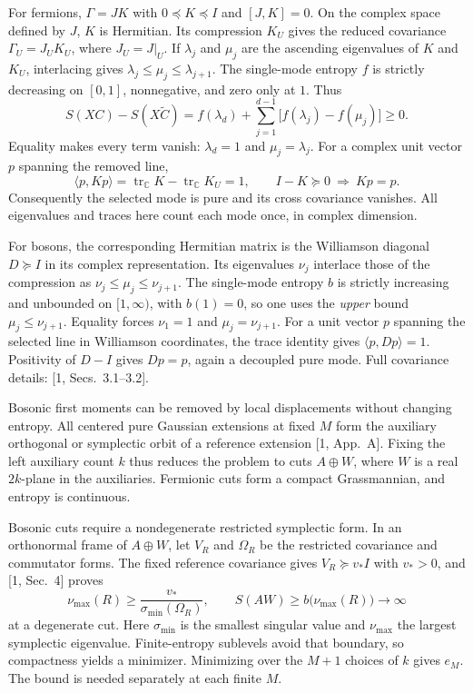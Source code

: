 \documentclass[11pt,a4paper]{article}
\newcommand{\C}{\mathbb C}
\newcommand{\tr}{\operatorname{tr}}
\newcommand{\heading}[1]{\par\vspace{5pt}{\large\bfseries #1}\par\vspace{1pt}}
\begin{document}
For fermions, $\Gamma=JK$ with $0\preceq K\preceq I$ and $[J,K]=0$. On the complex space defined by $J$, $K$ is Hermitian. Its compression $K_U$ gives the reduced covariance $\Gamma_U=J_UK_U$, where $J_U=J|_U$. If $\lambda_j$ and $\mu_j$ are the ascending eigenvalues of $K$ and $K_U$, interlacing gives $\lambda_j\le\mu_j\le\lambda_{j+1}$. The single-mode entropy $f$ is strictly decreasing on $[0,1]$, nonnegative, and zero only at $1$. Thus
\begin{equation*}
S(XC)-S(X\widetilde C)
=f(\lambda_d)+\sum_{j=1}^{d-1}\bigl[f(\lambda_j)-f(\mu_j)\bigr]\ge0.
\end{equation*}
Equality makes every term vanish: $\lambda_d=1$ and $\mu_j=\lambda_j$. For a complex unit vector $p$ spanning the removed line,
\begin{equation*}
\langle p,Kp\rangle=\tr_{\C}K-\tr_{\C}K_U=1,
\qquad I-K\succeq0\ \Longrightarrow\ Kp=p.
\end{equation*}
Consequently the selected mode is pure and its cross covariance vanishes. All eigenvalues and traces here count each mode once, in complex dimension.

For bosons, the corresponding Hermitian matrix is the Williamson diagonal $D\succeq I$ in its complex representation. Its eigenvalues $\nu_j$ interlace those of the compression as $\nu_j\le\mu_j\le\nu_{j+1}$. The single-mode entropy $b$ is strictly increasing and unbounded on $[1,\infty)$, with $b(1)=0$, so one uses the \emph{upper} bound $\mu_j\le\nu_{j+1}$. Equality forces $\nu_1=1$ and $\mu_j=\nu_{j+1}$. For a unit vector $p$ spanning the selected line in Williamson coordinates, the trace identity gives $\langle p,Dp\rangle=1$. Positivity of $D-I$ gives $Dp=p$, again a decoupled pure mode. Full covariance details: [1, Secs.~3.1--3.2].

\heading{Why the fixed-total minimum exists}
Bosonic first moments can be removed by local displacements without changing entropy. All centered pure Gaussian extensions at fixed $M$ form the auxiliary orthogonal or symplectic orbit of a reference extension [1, App.~A]. Fixing the left auxiliary count $k$ thus reduces the problem to cuts $A\oplus W$, where $W$ is a real $2k$-plane in the auxiliaries. Fermionic cuts form a compact Grassmannian, and entropy is continuous.

Bosonic cuts require a nondegenerate restricted symplectic form. In an orthonormal frame of $A\oplus W$, let $V_R$ and $\Omega_R$ be the restricted covariance and commutator forms. The fixed reference covariance gives $V_R\succeq v_*I$ with $v_*>0$, and [1, Sec.~4] proves
\begin{equation*}
\nu_{\max}(R)\ge\frac{v_*}{\sigma_{\min}(\Omega_R)},
\qquad S(AW)\ge b\bigl(\nu_{\max}(R)\bigr)\longrightarrow\infty
\end{equation*}
at a degenerate cut. Here $\sigma_{\min}$ is the smallest singular value and $\nu_{\max}$ the largest symplectic eigenvalue. Finite-entropy sublevels avoid that boundary, so compactness yields a minimizer. Minimizing over the $M+1$ choices of $k$ gives $e_M$. The bound is needed separately at each finite $M$.
\end{document}

